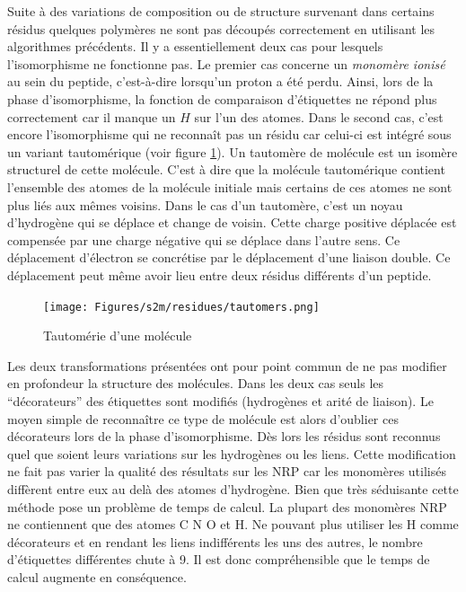 Suite à des variations de composition ou de structure survenant dans certains résidus quelques polymères ne sont pas découpés correctement en utilisant les algorithmes précédents.
Il y a essentiellement deux cas pour lesquels l'isomorphisme ne fonctionne pas.
Le premier cas concerne un \textit{monomère ionisé} au sein du peptide, c'est-à-dire lorsqu'un proton a été perdu.
Ainsi, lors de la phase d'isomorphisme, la fonction de comparaison d'étiquettes ne répond plus correctement car il manque un $H$ sur l'un des atomes.
Dans le second cas, c'est encore l'isomorphisme qui ne reconnaît pas un résidu car celui-ci est intégré sous un variant tautomérique (voir figure \ref{tautomer}).
Un tautomère de molécule est un isomère structurel de cette molécule.
C'est à dire que la molécule tautomérique contient l'ensemble des atomes de la molécule initiale  mais certains de ces atomes ne sont plus liés aux mêmes voisins.
Dans le cas d'un tautomère, c'est un noyau d'hydrogène qui se déplace et change de voisin.
Cette charge positive déplacée est compensée par une charge négative qui se déplace dans l'autre sens.
Ce déplacement d'électron se concrétise par le déplacement d'une liaison double.
Ce déplacement peut même avoir lieu entre deux résidus différents d'un peptide.

\begin{figure}
  \begin{center}
    \texttt{[image: Figures/s2m/residues/tautomers.png]}
    \caption{\label{tautomer}Tautomérie d'une molécule}
  \end{center}
\end{figure}

Les deux transformations présentées ont pour point commun de ne pas modifier en profondeur la structure des molécules.
Dans les deux cas seuls les ``décorateurs'' des étiquettes sont modifiés (hydrogènes et arité de liaison).
Le moyen simple de reconnaître ce type de molécule est alors d'oublier ces décorateurs lors de la phase d'isomorphisme.
Dès lors les résidus sont reconnus quel que soient leurs variations sur les hydrogènes ou les liens.
Cette modification ne fait pas varier la qualité des résultats sur les NRP car les monomères utilisés diffèrent entre eux au delà des atomes d'hydrogène.
Bien que très séduisante cette méthode pose un problème de temps de calcul.
La plupart des monomères NRP ne contiennent que des atomes C N O et H.
Ne pouvant plus utiliser les H comme décorateurs et en rendant les liens indifférents les uns des autres, le nombre d'étiquettes différentes chute à 9.
Il est donc compréhensible que le temps de calcul augmente en conséquence.

